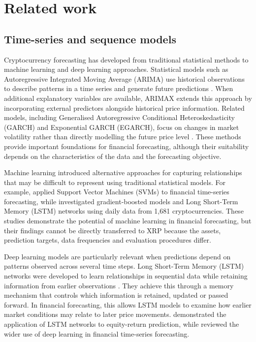 \section{Related work}\label{sec:related}

\subsection{Time-series and sequence models}\label{sec:related_models}

Cryptocurrency forecasting has developed from traditional statistical methods to machine learning and deep learning approaches. Statistical models such as Autoregressive Integrated Moving Average (ARIMA) use historical observations to describe patterns in a time series and generate future predictions \citep{Hyndman2021}. When additional explanatory variables are available, ARIMAX extends this approach by incorporating external predictors alongside historical price information. Related models, including Generalised Autoregressive Conditional Heteroskedasticity (GARCH) and Exponential GARCH (EGARCH), focus on changes in market volatility rather than directly modelling the future price level \citep{Bollerslev1986,Nelson1991}. These methods provide important foundations for financial forecasting, although their suitability depends on the characteristics of the data and the forecasting objective.

Machine learning introduced alternative approaches for capturing relationships that may be difficult to represent using traditional statistical models. For example, \citet{Tay2001} applied Support Vector Machines (SVMs) to financial time-series forecasting, while \citet{Alessandretti2018} investigated gradient-boosted models and Long Short-Term Memory (LSTM) networks using daily data from 1,681 cryptocurrencies. These studies demonstrate the potential of machine learning in financial forecasting, but their findings cannot be directly transferred to XRP because the assets, prediction targets, data frequencies and evaluation procedures differ.

Deep learning models are particularly relevant when predictions depend on patterns observed across several time steps. Long Short-Term Memory (LSTM) networks were developed to learn relationships in sequential data while retaining information from earlier observations \citep{Hochreiter1997}. They achieve this through a memory mechanism that controls which information is retained, updated or passed forward. In financial forecasting, this allows LSTM models to examine how earlier market conditions may relate to later price movements. \citet{Fischer2018} demonstrated the application of LSTM networks to equity-return prediction, while \citet{Sezer2020} reviewed the wider use of deep learning in financial time-series forecasting.

